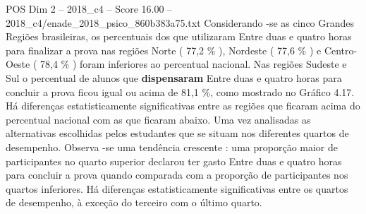 \begin{textsample}{POS Dim 2 – 2018\_c4 – Score 16.00 – 2018\_c4/enade\_2018\_psico\_860b383a75.txt}
Considerando -se as cinco Grandes Regiões brasileiras, os percentuais dos que utilizaram Entre duas e quatro horas para finalizar a prova nas regiões Norte ( 77,2 \% ), Nordeste ( 77,6 \% ) e Centro-Oeste ( 78,4 \% ) foram inferiores ao percentual nacional.
Nas regiões Sudeste e Sul o percentual de alunos que \textbf{dispensaram} Entre duas e quatro horas para concluir a prova ficou igual ou acima de 81,1 \%, como mostrado no Gráfico 4.17.
Há diferenças estatisticamente significativas entre as regiões que ficaram acima do percentual nacional com as que ficaram abaixo.
Uma vez analisadas as alternativas escolhidas pelos estudantes que se situam nos diferentes quartos de desempenho.
Observa -se uma tendência crescente : uma proporção maior de participantes no quarto superior declarou ter gasto Entre duas e quatro horas para concluir a prova quando comparada com a proporção de participantes nos quartos inferiores.
Há diferenças estatisticamente significativas entre os quartos de desempenho, à exceção do terceiro com o último quarto.

\end{textsample}
